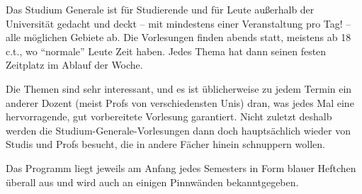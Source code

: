 
Das Studium Generale ist für Studierende und für Leute außerhalb der Universität
  gedacht und deckt -- mit mindestens einer Veranstaltung pro Tag! -- alle
  möglichen Gebiete ab.  Die Vorlesungen finden abends statt, meistens ab 18
  c.t., wo "`normale"' Leute Zeit haben.  Jedes Thema hat dann seinen festen Zeitplatz im
  Ablauf der Woche.

Die Themen sind  sehr interessant, und es ist üblicherweise
  zu jedem Termin ein anderer Dozent (meist Profs von verschiedensten Unis)
  dran, was jedes Mal eine hervorragende, gut vorbereitete Vorlesung
  garantiert.  Nicht zuletzt deshalb werden die Studium-Generale-Vorlesungen
  dann doch hauptsächlich wieder von Studis und Profs besucht, die in
  andere Fächer hinein schnuppern wollen.

Das Programm liegt jeweils am Anfang jedes Semesters in Form blauer
  Heftchen überall aus  und wird auch an einigen Pinnwänden  bekanntgegeben.
